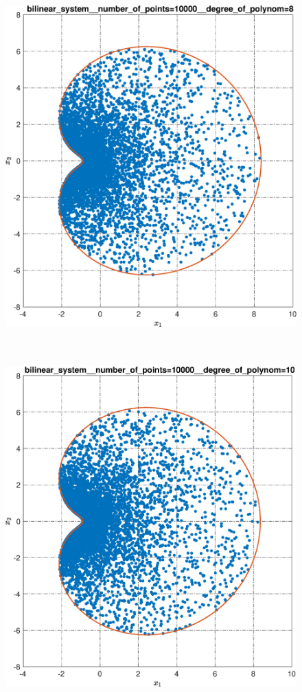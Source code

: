 \documentclass[../main.tex]{subfiles}
\begin{document}
\begin{figure}[ht!]
\begin{minipage}[b]{.3\linewidth}
  		\includegraphics[width=\linewidth]{images/bilinear_system__number_of_points=10000__degree_of_polynom=8.eps}
  	\end{minipage} 
  	\hfill
  	\begin{minipage}[b]{.3\linewidth} 
  		\small
  		\centering 
  		\includegraphics[width=\linewidth]{images/bilinear_system__number_of_points=10000__degree_of_polynom=10.eps}

\end{minipage}
\end{figure}
\end{document}
